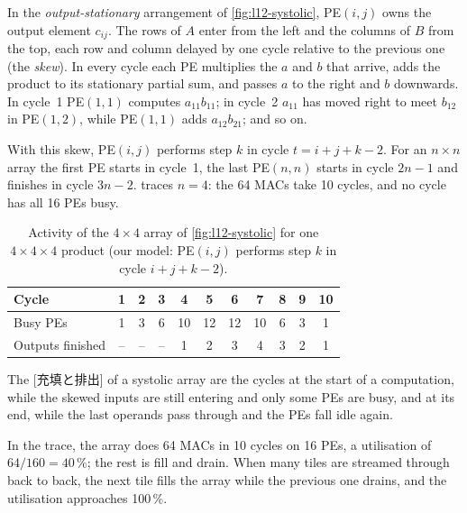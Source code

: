 \documentclass[../main.tex]{subfiles}
\begin{document}
In the \emph{output-stationary} arrangement of
\cref{fig:l12-systolic}, PE$(i,j)$ owns the output element $c_{ij}$.
The rows of $A$ enter from the left and the columns of $B$ from the
top, each row and column delayed by one cycle relative to the previous
one (the \emph{skew}).  In every cycle each PE multiplies the $a$ and
$b$ that arrive, adds the product to its stationary partial sum, and
passes $a$ to the right and $b$ downwards.  In cycle~1 PE$(1,1)$
computes $a_{11} b_{11}$; in cycle~2 $a_{11}$ has moved right to meet
$b_{12}$ in PE$(1,2)$, while PE$(1,1)$ adds $a_{12} b_{21}$; and so on.

With this skew, PE$(i,j)$ performs step $k$ in cycle $t = i + j + k - 2$.
For an $n \times n$ array the first PE starts in cycle~1, the last
PE$(n,n)$ starts in cycle $2n - 1$ and finishes in cycle $3n - 2$.
 traces $n = 4$: the 64 MACs take 10
cycles, and no cycle has all 16 PEs busy.

\begin{table}[htbp]
  \centering
  \caption{Activity of the $4 \times 4$ array of \cref{fig:l12-systolic}
    for one $4 \times 4 \times 4$ product (our model:
    PE$(i,j)$ performs step $k$ in cycle $i + j + k - 2$).}
  \label{tab:l12-systolic-trace}
  \begin{tabular}{lcccccccccc}
    \toprule
    Cycle & 1 & 2 & 3 & 4 & 5 & 6 & 7 & 8 & 9 & 10 \\
    \midrule
    Busy PEs & 1 & 3 & 6 & 10 & 12 & 12 & 10 & 6 & 3 & 1 \\
    Outputs finished & -- & -- & -- & 1 & 2 & 3 & 4 & 3 & 2 & 1 \\
    \bottomrule
  \end{tabular}
\end{table}

\begin{definition}
  The [充填と排出] of a systolic array are the
  cycles at the start of a computation, while the skewed inputs are
  still entering and only some PEs are busy, and at its end, while the
  last operands pass through and the PEs fall idle again.
\end{definition}

In the trace, the array does 64 MACs in 10 cycles on 16 PEs, a
utilisation of $64/160 = 40\,\%$; the rest is fill and drain.  When
many tiles are streamed through back to back, the next tile fills the
array while the previous one drains, and the utilisation approaches
100\,\%.
\end{document}
